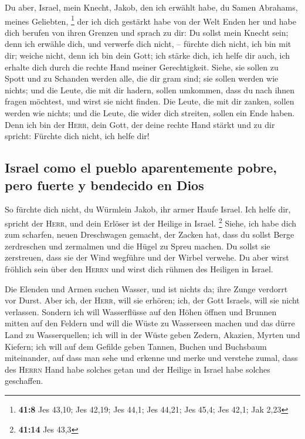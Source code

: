  Du aber, Israel, mein Knecht, Jakob, den ich erwählt
habe, du Samen Abrahams, meines Geliebten, \footnote{\textbf{41:8} Jes
  43,10; Jes 42,19; Jes 44,1; Jes 44,21; Jes 45,4; Jes 42,1; Jak 2,23}
 der ich dich gestärkt habe von der Welt Enden her und
habe dich berufen von ihren Grenzen und sprach zu dir: Du sollst mein
Knecht sein; denn ich erwähle dich, und verwerfe dich nicht, --
 fürchte dich nicht, ich bin mit dir; weiche nicht, denn
ich bin dein Gott; ich stärke dich, ich helfe dir auch, ich erhalte dich
durch die rechte Hand meiner Gerechtigkeit.  Siehe, sie
sollen zu Spott und zu Schanden werden alle, die dir gram sind; sie
sollen werden wie nichts; und die Leute, die mit dir hadern, sollen
umkommen,  dass du nach ihnen fragen möchtest, und wirst
sie nicht finden. Die Leute, die mit dir zanken, sollen werden wie
nichts; und die Leute, die wider dich streiten, sollen ein Ende haben.
 Denn ich bin der \textsc{Herr}, dein Gott, der deine
rechte Hand stärkt und zu dir spricht: Fürchte dich nicht, ich helfe
dir!

\hypertarget{israel-como-el-pueblo-aparentemente-pobre-pero-fuerte-y-bendecido-en-dios}{%
\subsection{Israel como el pueblo aparentemente pobre, pero fuerte y
bendecido en
Dios}\label{israel-como-el-pueblo-aparentemente-pobre-pero-fuerte-y-bendecido-en-dios}}

 So fürchte dich nicht, du Würmlein Jakob, ihr armer
Haufe Israel. Ich helfe dir, spricht der \textsc{Herr}, und dein Erlöser
ist der Heilige in Israel. \footnote{\textbf{41:14} Jes 43,3}
 Siehe, ich habe dich zum scharfen, neuen Dreschwagen
gemacht, der Zacken hat, dass du sollst Berge zerdreschen und zermalmen
und die Hügel zu Spreu machen.  Du sollst sie zerstreuen,
dass sie der Wind wegführe und der Wirbel verwehe. Du aber wirst
fröhlich sein über den \textsc{Herrn} und wirst dich rühmen des Heiligen
in Israel.

 Die Elenden und Armen suchen Wasser, und ist nichts da;
ihre Zunge verdorrt vor Durst. Aber ich, der \textsc{Herr}, will sie
erhören; ich, der Gott Israels, will sie nicht verlassen.
 Sondern ich will Wasserflüsse auf den Höhen öffnen und
Brunnen mitten auf den Feldern und will die Wüste zu Wasserseen machen
und das dürre Land zu Wasserquellen;  ich will in der
Wüste geben Zedern, Akazien, Myrten und Kiefern; ich will auf dem
Gefilde geben Tannen, Buchen und Buchsbaum miteinander, 
auf dass man sehe und erkenne und merke und verstehe zumal, dass des
\textsc{Herrn} Hand habe solches getan und der Heilige in Israel habe
solches geschaffen.

